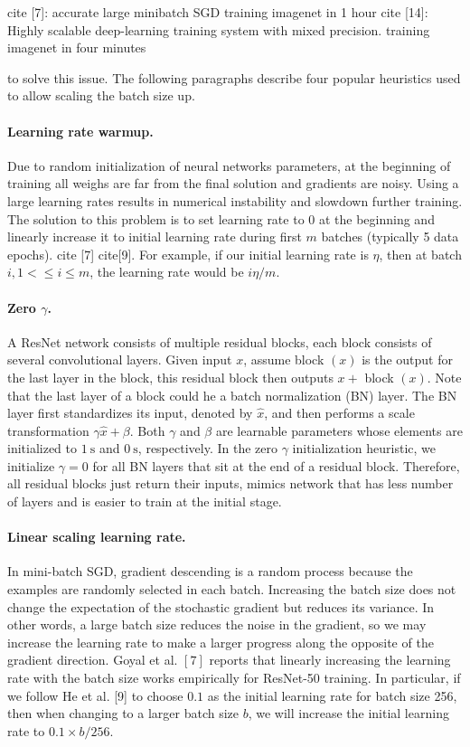 cite [7]: accurate large minibatch SGD training imagenet in 1 hour
cite [14]: Highly scalable deep-learning training system with mixed precision. training imagenet in four minutes

to solve this issue. The following paragraphs describe four popular heuristics used to allow scaling the batch size up. 

\paragraph{Learning rate warmup.}
Due to random initialization of neural networks parameters, at the beginning of training all weighs are far from the final solution and gradients are noisy. Using a large learning rates results in numerical instability and slowdown further training. The solution to this problem is to set learning rate to 0 at the beginning and linearly increase it to initial learning rate during first $m$ batches (typically 5 data epochs). cite [7] cite[9]. For example, if our initial learning rate is $\eta$, then at batch $i, 1 < \leq i \leq m$, the learning rate would be $ i \eta / m$.

\paragraph{Zero $\gamma$.} %
A ResNet network consists of multiple residual blocks, each block consists of several convolutional layers. Given input $x$, assume block $(x)$ is the output for the last layer in the block, this residual block then outputs $x+$ block $(x)$. Note that the last layer of a block could he a batch normalization (BN) layer. The BN layer first standardizes its input, denoted by $\hat{x}$, and then performs a scale transformation $\gamma \hat{x}+\beta .$ Both $\gamma$ and $\beta$ are learnable parameters whose elements are initialized to $1 \mathrm{~s}$ and $0 \mathrm{~s}$, respectively. In the zero $\gamma$ initialization heuristic, we initialize $\gamma=0$ for all BN layers that sit at the end of a residual block. Therefore, all residual blocks just return their inputs, mimics network that has less number of layers and is easier to train at the initial stage.

\paragraph{Linear scaling learning rate.}
In mini-batch SGD, gradient descending is a random process because the examples are randomly selected in each batch. Increasing the batch size does not change the expectation of the stochastic gradient but reduces its variance. In other words, a large batch size reduces the noise in the gradient, so we may increase the learning rate to make a larger progress along the opposite of the gradient direction. Goyal et al. $[7]$ reports that linearly increasing the learning rate with the batch size works empirically for ResNet-50 training. In particular, if we follow He et al. [9] to choose $0.1$ as the initial learning rate for batch size 256, then when changing to a larger batch size $b$, we will increase the initial learning rate to $0.1 \times b / 256 .$

